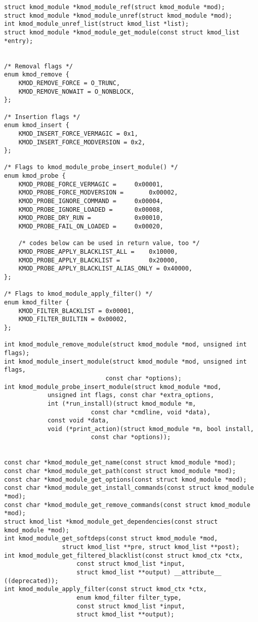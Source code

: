 \documentclass[11pt,a4paper]{article}
\begin{document}
{\begin{shaded}
\begin{verbatim}
struct kmod_module *kmod_module_ref(struct kmod_module *mod);
struct kmod_module *kmod_module_unref(struct kmod_module *mod);
int kmod_module_unref_list(struct kmod_list *list);
struct kmod_module *kmod_module_get_module(const struct kmod_list *entry);


/* Removal flags */
enum kmod_remove {
    KMOD_REMOVE_FORCE = O_TRUNC,
    KMOD_REMOVE_NOWAIT = O_NONBLOCK,
};

/* Insertion flags */
enum kmod_insert {
    KMOD_INSERT_FORCE_VERMAGIC = 0x1,
    KMOD_INSERT_FORCE_MODVERSION = 0x2,
};

/* Flags to kmod_module_probe_insert_module() */
enum kmod_probe {
    KMOD_PROBE_FORCE_VERMAGIC =     0x00001,
    KMOD_PROBE_FORCE_MODVERSION =       0x00002,
    KMOD_PROBE_IGNORE_COMMAND =     0x00004,
    KMOD_PROBE_IGNORE_LOADED =      0x00008,
    KMOD_PROBE_DRY_RUN =            0x00010,
    KMOD_PROBE_FAIL_ON_LOADED =     0x00020,

    /* codes below can be used in return value, too */
    KMOD_PROBE_APPLY_BLACKLIST_ALL =    0x10000,
    KMOD_PROBE_APPLY_BLACKLIST =        0x20000,
    KMOD_PROBE_APPLY_BLACKLIST_ALIAS_ONLY = 0x40000,
};

/* Flags to kmod_module_apply_filter() */
enum kmod_filter {
    KMOD_FILTER_BLACKLIST = 0x00001,
    KMOD_FILTER_BUILTIN = 0x00002,
};

int kmod_module_remove_module(struct kmod_module *mod, unsigned int flags);
int kmod_module_insert_module(struct kmod_module *mod, unsigned int flags,
                            const char *options);
int kmod_module_probe_insert_module(struct kmod_module *mod,
            unsigned int flags, const char *extra_options,
            int (*run_install)(struct kmod_module *m,
                        const char *cmdline, void *data),
            const void *data,
            void (*print_action)(struct kmod_module *m, bool install,
                        const char *options));


const char *kmod_module_get_name(const struct kmod_module *mod);
const char *kmod_module_get_path(const struct kmod_module *mod);
const char *kmod_module_get_options(const struct kmod_module *mod);
const char *kmod_module_get_install_commands(const struct kmod_module *mod);
const char *kmod_module_get_remove_commands(const struct kmod_module *mod);
struct kmod_list *kmod_module_get_dependencies(const struct kmod_module *mod);
int kmod_module_get_softdeps(const struct kmod_module *mod,
                struct kmod_list **pre, struct kmod_list **post);
int kmod_module_get_filtered_blacklist(const struct kmod_ctx *ctx,
                    const struct kmod_list *input,
                    struct kmod_list **output) __attribute__ ((deprecated));
int kmod_module_apply_filter(const struct kmod_ctx *ctx,
                    enum kmod_filter filter_type,
                    const struct kmod_list *input,
                    struct kmod_list **output);




\end{verbatim}
\end{shaded}}
\end{document}
